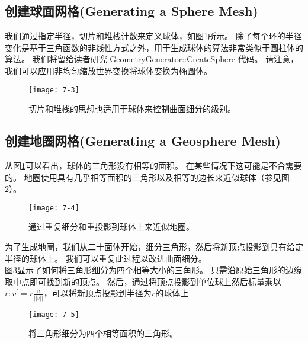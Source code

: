 \subsection{创建球面网格(Generating a Sphere Mesh)}
\begin{flushleft}
我们通过指定半径，切片和堆栈计数来定义球体，如图\ref{fig:7-3}所示。 除了每个环的半径变化是基于三角函数的非线性方式之外，用于生成球体的算法非常类似于圆柱体的算法。 我们将留给读者研究 GeometryGenerator::CreateSphere 代码。 请注意，我们可以应用非均匀缩放世界变换将球体变换为椭圆体。
\end{flushleft}
\begin{figure}[h]
    \texttt{[image: 7-3]}
    \centering
    \caption{切片和堆栈的思想也适用于球体来控制曲面细分的级别。}
    \label{fig:7-3}
\end{figure}
\clearpage

\subsection{创建地圈网格(Generating a Geosphere Mesh)}
\begin{flushleft}
从图\ref{fig:7-3}可以看出，球体的三角形没有相等的面积。 在某些情况下这可能是不合需要的。 地圈使用具有几乎相等面积的三角形以及相等的边长来近似球体（参见图\ref{fig:7-4}）。
\end{flushleft}

\begin{figure}[h]
    \texttt{[image: 7-4]}
    \centering
    \caption{通过重复细分和重投影到球体上来近似地圈。}
    \label{fig:7-4}
\end{figure}
\clearpage

\begin{flushleft}
为了生成地圈，我们从二十面体开始，细分三角形，然后将新顶点投影到具有给定半径的球体上。 我们可以重复此过程以改进曲面细分。\\
图\ref{fig:7-5}显示了如何将三角形细分为四个相等大小的三角形。 只需沿原始三角形的边缘取中点即可找到新的顶点。 然后，通过将顶点投影到单位球上然后标量乘以$r: v^{'}=r \frac{v}{||v||}$，可以将新顶点投影到半径为$r$的球体上
\end{flushleft}

\begin{figure}[h]
    \texttt{[image: 7-5]}
    \centering
    \caption{将三角形细分为四个相等面积的三角形。}
    \label{fig:7-5}
\end{figure}
\clearpage


